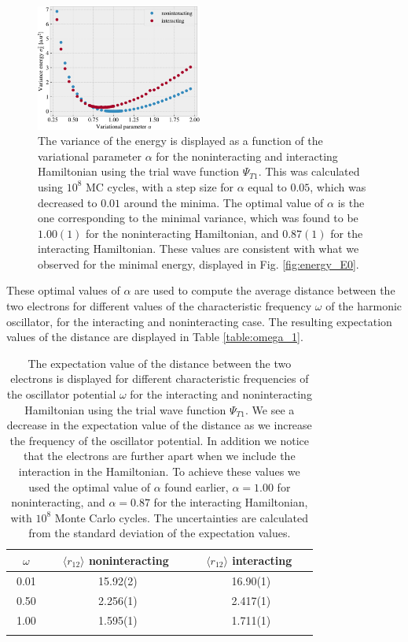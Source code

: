 \documentclass[%
 reprint,
nofootinbib,
aps,
]{revtex4-1}
\begin{document}
\begin{figure}
  \centering
  \includegraphics[width=0.485\textwidth]{../figures/variance_c.pdf}
  \caption{The variance of the energy is displayed as a function of the variational parameter $\alpha$ for the noninteracting and interacting Hamiltonian using the trial wave function $\Psi_{T1}$. This was calculated using $10^8$ MC cycles, with a step size for $\alpha$ equal to $0.05$, which was decreased to $0.01$ around the minima. The optimal value of $\alpha$ is the one corresponding to the minimal variance, which was found to be $1.00(1)$ for the noninteracting Hamiltonian, and $0.87(1)$ for the interacting Hamiltonian. These values are consistent with what we observed for the minimal energy, displayed in Fig. \vref{fig:energy_E0}.}
  \label{fig:variance_E0}
\end{figure}

These optimal values of $\alpha$ are used to compute the average distance between the two electrons for different values of the characteristic frequency $\omega$ of the harmonic oscillator, for the interacting and noninteracting case. The resulting expectation values of the distance are displayed in Table \vref{table:omega_1}.

\begin{table}[]
  \caption{The expectation value of the distance between the two electrons is displayed for different characteristic frequencies of the oscillator potential $\omega$ for the interacting and noninteracting Hamiltonian using the trial wave function $\Psi_{T1}$. We see a decrease in the expectation value of the distance as we increase the frequency of the oscillator potential. In addition we notice that the electrons are further apart when we include the interaction in the Hamiltonian. To achieve these values we used the optimal value of $\alpha$ found earlier, $\alpha=1.00$ for noninteracting, and $\alpha=0.87$ for the interacting Hamiltonian, with $10^{8}$ Monte Carlo cycles. The uncertainties are calculated from the standard deviation of the expectation values.}
  \begin{tabular}{@{}ccc@{}}
  \toprule
  $\quad\omega\quad$ & $\quad\langle r_{12} \rangle$ noninteracting $\quad$ & $\quad\langle r_{12} \rangle$ interacting $\quad$\\ \midrule
  0.01 & 15.92(2) & 16.90(1) \\
  0.50 & 2.256(1) & 2.417(1) \\
  1.00 & 1.595(1) & 1.711(1) \\ \botrule
  \end{tabular}
  \label{table:omega_1}
\end{table}
\end{document}

